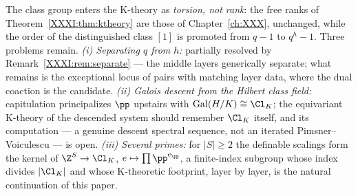 The class group enters the K-theory as \emph{torsion, not rank}: the free ranks of
Theorem~\ref{XXXI:thm:ktheory} are those of Chapter~\ref{ch:XXX}, unchanged, while the order of the
distinguished class $[1]$ is promoted from $q-1$ to $q^{h}-1$. Three problems remain.
\emph{(i) Separating $q$ from $h$:} partially resolved by Remark~\ref{XXXI:rem:separate} ---
the middle layers generically separate; what remains is the exceptional locus of pairs
with matching layer data, where the dual coaction is the candidate. \emph{(ii) Galois descent from the Hilbert class field:}
capitulation principalizes $\pp$ upstairs with $\mathrm{Gal}(H/K)\cong\Cl_K$; the
equivariant K-theory of the descended system should remember $\Cl_K$ itself, and its
computation --- a genuine descent spectral sequence, not an iterated
Pimsner--Voiculescu --- is open. \emph{(iii) Several primes:} for $|S|\ge2$ the definable
scalings form the kernel of $\Z^S\to\Cl_K$, $e\mapsto\prod\pp^{e_\pp}$, a finite-index
subgroup whose index divides $|\Cl_K|$ and whose K-theoretic footprint, layer by layer, is
the natural continuation of this paper.

